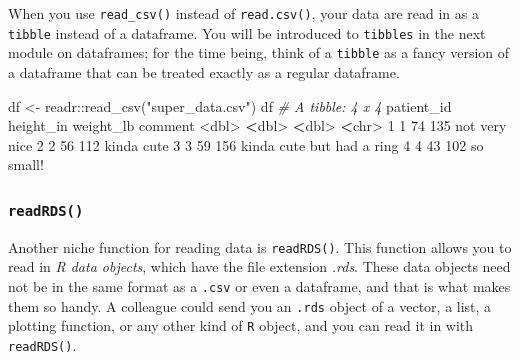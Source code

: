\documentclass[
]{book}
\newenvironment{Shaded}{\begin{snugshade}}{\end{snugshade}}
\newcommand{\CommentTok}[1]{\textcolor[rgb]{0.56,0.35,0.01}{\textit{#1}}}
\newcommand{\DecValTok}[1]{\textcolor[rgb]{0.00,0.00,0.81}{#1}}
\newcommand{\ErrorTok}[1]{\textcolor[rgb]{0.64,0.00,0.00}{\textbf{#1}}}
\newcommand{\FunctionTok}[1]{\textcolor[rgb]{0.00,0.00,0.00}{#1}}
\newcommand{\NormalTok}[1]{#1}
\newcommand{\OtherTok}[1]{\textcolor[rgb]{0.56,0.35,0.01}{#1}}
\newcommand{\SpecialCharTok}[1]{\textcolor[rgb]{0.00,0.00,0.00}{#1}}
\newcommand{\StringTok}[1]{\textcolor[rgb]{0.31,0.60,0.02}{#1}}
\begin{document}
When you use \texttt{read\_csv()} instead of \texttt{read.csv()}, your data are read in as a \texttt{tibble} instead of a dataframe. You will be introduced to \texttt{tibbles} in the next module on dataframes; for the time being, think of a \texttt{tibble} as a fancy version of a dataframe that can be treated exactly as a regular dataframe.

\begin{Shaded}
\begin{Highlighting}[]
\NormalTok{df }\OtherTok{\textless{}{-}}\NormalTok{ readr}\SpecialCharTok{::}\FunctionTok{read\_csv}\NormalTok{(}\StringTok{"super\_data.csv"}\NormalTok{)}
\NormalTok{df}
\CommentTok{\# A tibble: 4 x 4}
\NormalTok{  patient\_id height\_in weight\_lb comment                  }
       \SpecialCharTok{\textless{}}\NormalTok{dbl}\SpecialCharTok{\textgreater{}}     \ErrorTok{\textless{}}\NormalTok{dbl}\SpecialCharTok{\textgreater{}}     \ErrorTok{\textless{}}\NormalTok{dbl}\SpecialCharTok{\textgreater{}} \ErrorTok{\textless{}}\NormalTok{chr}\SpecialCharTok{\textgreater{}}                    
\DecValTok{1}          \DecValTok{1}        \DecValTok{74}       \DecValTok{135}\NormalTok{ not very nice            }
\DecValTok{2}          \DecValTok{2}        \DecValTok{56}       \DecValTok{112}\NormalTok{ kinda cute               }
\DecValTok{3}          \DecValTok{3}        \DecValTok{59}       \DecValTok{156}\NormalTok{ kinda cute but had a ring}
\DecValTok{4}          \DecValTok{4}        \DecValTok{43}       \DecValTok{102}\NormalTok{ so small}\SpecialCharTok{!}                
\end{Highlighting}
\end{Shaded}

\hypertarget{readrds}{%
\subsubsection*{\texorpdfstring{\texttt{readRDS()}}{readRDS()}}\label{readrds}}

Another niche function for reading data is \texttt{readRDS()}. This function allows you to read in \emph{R data objects}, which have the file extension \emph{.rds}. These data objects need not be in the same format as a \texttt{.csv} or even a dataframe, and that is what makes them so handy. A colleague could send you an \texttt{.rds} object of a vector, a list, a plotting function, or any other kind of \texttt{R} object, and you can read it in with \texttt{readRDS()}.
\end{document}
